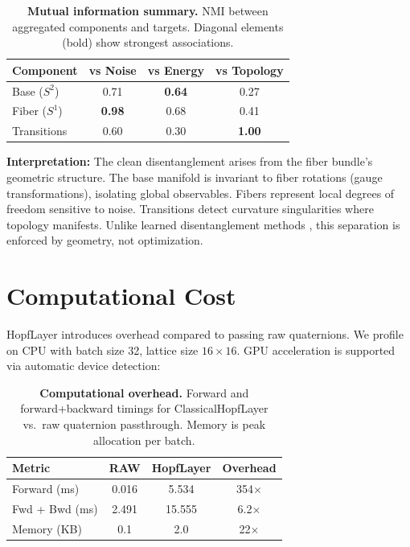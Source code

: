 \documentclass[10pt,twocolumn]{article}
\begin{document}
\begin{table}[!htbp]
\centering
\caption{\textbf{Mutual information summary.} NMI between aggregated components and targets. Diagonal elements (bold) show strongest associations.}
\label{tab:mi_summary}
\small
\begin{tabular}{@{}lccc@{}}
\toprule
\textbf{Component} & \textbf{vs Noise} & \textbf{vs Energy} & \textbf{vs Topology} \\
\midrule
Base ($S^2$) & 0.71 & \textbf{0.64} & 0.27 \\
Fiber ($S^1$) & \textbf{0.98} & 0.68 & 0.41 \\
Transitions & 0.60 & 0.30 & \textbf{1.00} \\
\bottomrule
\end{tabular}
\end{table}

\textbf{Interpretation:} The clean disentanglement arises from the fiber bundle's geometric structure. The base manifold is invariant to fiber rotations (gauge transformations), isolating global observables. Fibers represent local degrees of freedom sensitive to noise. Transitions detect curvature singularities where topology manifests. Unlike learned disentanglement methods \citep{higgins2017beta,locatello2019challenging}, this separation is enforced by geometry, not optimization.

\FloatBarrier
\section{Computational Cost}

HopfLayer introduces overhead compared to passing raw quaternions. We profile on CPU with batch size 32, lattice size $16 \times 16$. GPU acceleration is supported via automatic device detection:

\begin{table}[!htbp]
\centering
\caption{\textbf{Computational overhead.} Forward and forward+backward timings for ClassicalHopfLayer vs.\ raw quaternion passthrough. Memory is peak allocation per batch.}
\label{tab:timing}
\small
\begin{tabular}{@{}lccc@{}}
\toprule
\textbf{Metric} & \textbf{RAW} & \textbf{HopfLayer} & \textbf{Overhead} \\
\midrule
Forward (ms) & 0.016 & 5.534 & 354$\times$ \\
Fwd + Bwd (ms) & 2.491 & 15.555 & 6.2$\times$ \\
Memory (KB) & 0.1 & 2.0 & 22$\times$ \\
\bottomrule
\end{tabular}
\end{table}
\end{document}
